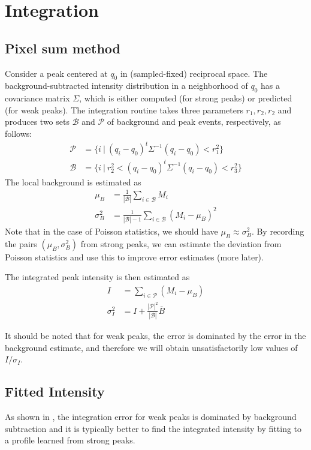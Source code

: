 \documentclass[twocolumn,preprintnumbers,amsmath,amssymb]{revtex4}
\newcommand{\calP}{\mathcal{P}}
\newcommand{\calB}{\mathcal{B}}
\begin{document}
\section{Integration} \label{integration}
\subsection{Pixel sum method}
Consider a peak centered at $q_0$ in (sampled-fixed) reciprocal space. The background-subtracted intensity distribution in a neighborhood of $q_0$ has a covariance matrix $\Sigma$, which is either computed (for strong peaks) or predicted (for weak peaks). The integration routine takes three parameters $r_1, r_2, r_2$ and produces
two sets $\calB$ and $\calP$ of background and peak events, respectively, as follows:
\begin{align}
  \calP &= \{ i \ | \ (q_i-q_0)^t \Sigma^{-1} (q_i-q_0) < r_1^2 \} \\
  \calB &= \{ i \ | \ r_2^2 < (q_i-q_0)^t \Sigma^{-1} (q_i-q_0) < r_3^2 \}
\end{align}
The local background is estimated as
\begin{align}
  \mu_B &= \frac{1}{|\calB|} \sum_{i \in \calB} M_i \\
  \sigma^2_B &= \frac{1}{|\calB|-1} \sum_{i \in \calB} (M_i - \mu_B)^2
\end{align}
Note that in the case of Poisson statistics, we should have $\mu_B \approx \sigma^2_B$. By recording the pairs $(\mu_B, \sigma^2_B)$ from strong peaks, we can estimate the deviation from Poisson statistics and use this to improve error estimates (more later).

The integrated peak intensity is then estimated as
\begin{align}
  I &= \sum_{i \in \calP} (M_i - \mu_B) \\
  \sigma^2_I &= I + \frac{|\calP|^2}{|\calB|} \overline{B}
\end{align}

It should be noted that for weak peaks, the error is dominated by the error in the background estimate, and therefore we will obtain unsatisfactorily low values of $I/\sigma_I$.

\subsection{Fitted Intensity}
As shown in \cite{diamond-1969}, the integration error for weak peaks is dominated by background subtraction
and it is typically better to find the integrated intensity by fitting to a profile learned from strong peaks.
\end{document}
